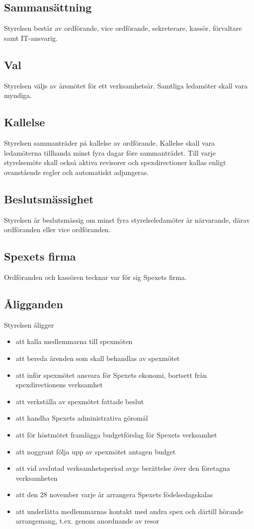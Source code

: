 \documentclass[a4paper]{article}
\begin{document}
\subsection{Sammansättning}
Styrelsen består av ordförande, vice ordförande, sekreterare, kassör, förvaltare samt IT-ansvarig.

\subsection{Val}
Styrelsen väljs av årsmötet för ett verksamhetsår. Samtliga ledamöter skall vara myndiga.

\subsection{Kallelse}
Styrelsen sammanträder på kallelse av ordförande. Kallelse skall vara ledamöterna tillhanda minst fyra dagar före sammanträdet. Till varje styrelsemöte skall också aktiva revisorer och spexdirectioner kallas enligt ovanstående regler och automatiskt adjungeras.

\subsection{Beslutsmässighet}
Styrelsen är beslutsmässig om minst fyra styrelseledamöter är närvarande, därav ordföranden eller vice ordföranden.

\subsection{Spexets firma}
Ordföranden och kassören tecknar var för sig Spexets firma.

\subsection{Åligganden}
Styrelsen åligger

\begin{itemize}
  \item att kalla medlemmarna till spexmöten
  \item att bereda ärenden som skall behandlas av spexmötet
  \item att inför spexmötet ansvara för Spexets ekonomi, bortsett från spexdirectionens verksamhet
  \item att verkställa av spexmötet fattade beslut
  \item att handha Spexets administrativa göromål
  \item att för höstmötet framlägga budgetförslag för Spexets verksamhet
  \item att noggrant följa upp av spexmötet antagen budget
  \item att vid avslutad verksamhetsperiod avge berättelse över den företagna verksamheten
  \item att den 28 november varje år arrangera Spexets födelsedagskalas
  \item att underlätta medlemmarnas kontakt med andra spex och därtill hörande arrangemang, t.ex. genom anordnande av resor
\end{itemize}
\end{document}
